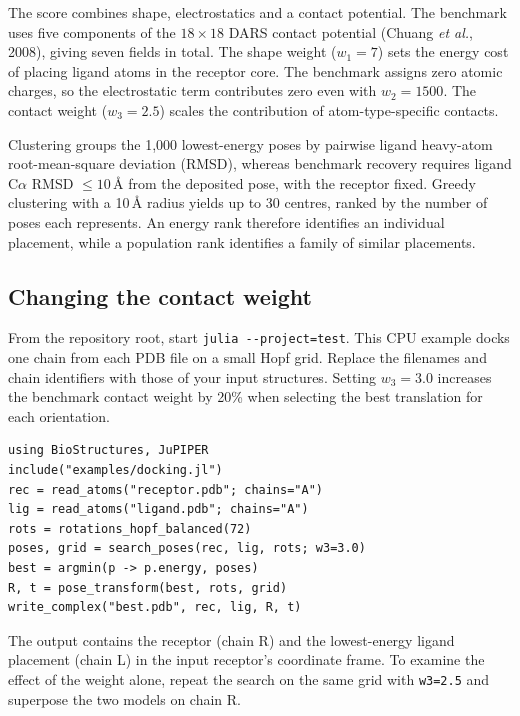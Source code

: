 \documentclass[10pt,twocolumn]{article}
\newcommand{\code}[1]{\texttt{\small #1}}
\begin{document}
The score combines shape, electrostatics and a contact potential. The benchmark
uses five components of the $18\times18$ DARS contact potential
(Chuang \textit{et al.}, 2008), giving seven fields in total. The shape
weight ($w_1=7$) sets the energy cost of placing ligand atoms in the receptor
core. The benchmark assigns zero atomic charges, so the electrostatic term
contributes zero even with $w_2=1500$. The contact weight ($w_3=2.5$)
scales the contribution of atom-type-specific contacts.

Clustering groups the 1,000 lowest-energy poses by pairwise ligand heavy-atom
root-mean-square deviation (RMSD), whereas benchmark recovery requires ligand
C$\alpha$ RMSD $\leq 10$\,\AA{} from the deposited pose, with the receptor fixed. Greedy
clustering with a 10\,\AA{} radius yields up to 30 centres, ranked by
the number of poses each represents. An energy rank therefore identifies
an individual placement, while a population rank identifies a family of
similar placements.

\subsection{Changing the contact weight}
From the repository root, start \texttt{julia -{}-project=test}.
This CPU example docks one chain from each PDB file on a small Hopf grid.
Replace the filenames and chain identifiers with those of your input structures.
Setting $w_3=3.0$ increases the benchmark contact weight by 20\% when
selecting the best translation for each orientation.
\begin{lstlisting}[basicstyle=\footnotesize\ttfamily,columns=fullflexible,
  keepspaces=true,showstringspaces=false,aboveskip=7pt,belowskip=7pt,
  frame=single,framerule=.3pt,framesep=3pt,xleftmargin=4pt,xrightmargin=4pt,
  rulecolor=\color{black!35},backgroundcolor=\color{black!3}]
using BioStructures, JuPIPER
include("examples/docking.jl")
rec = read_atoms("receptor.pdb"; chains="A")
lig = read_atoms("ligand.pdb"; chains="A")
rots = rotations_hopf_balanced(72)
poses, grid = search_poses(rec, lig, rots; w3=3.0)
best = argmin(p -> p.energy, poses)
R, t = pose_transform(best, rots, grid)
write_complex("best.pdb", rec, lig, R, t)
\end{lstlisting}
The output contains the receptor (chain R) and the lowest-energy ligand
placement (chain L) in the input receptor's coordinate frame. To examine
the effect of the weight alone, repeat the search on the same grid with
\code{w3=2.5} and superpose the two models on chain R.
\end{document}
